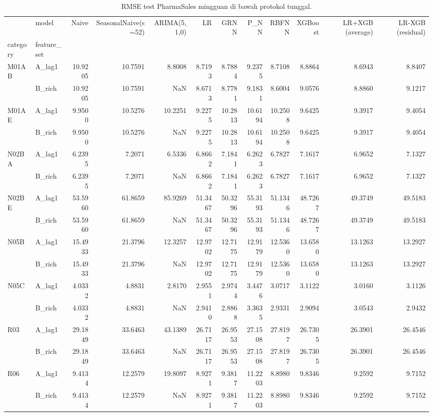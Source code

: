 \begin{table}
\caption{RMSE test PharmaSales mingguan di bawah protokol tunggal.}
\label{tab:tab2_pharma_weekly_rmse}
\begin{tabular}{llrrrrrrrrrr}
\toprule
 & model & Naive & SeasonalNaive(s=52) & ARIMA(5,1,0) & LR & GRNN & P\_NN & RBFNN & XGBoost & LR+XGB (average) & LR-XGB (residual) \\
category & feature_set &  &  &  &  &  &  &  &  &  &  \\
\midrule
\multirow[t]{2}{*}{M01AB} & A\_lag1 & 10.9205 & 10.7591 & 8.8008 & 8.7193 & 8.7884 & 9.2375 & 8.7108 & 8.8864 & 8.6943 & 8.8407 \\
 & B\_rich & 10.9205 & 10.7591 & NaN & 8.6713 & 8.7781 & 9.1831 & 8.6004 & 9.0576 & 8.8860 & 9.1217 \\
\cline{1-12}
\multirow[t]{2}{*}{M01AE} & A\_lag1 & 9.9500 & 10.5276 & 10.2251 & 9.2275 & 10.2813 & 10.6194 & 10.2508 & 9.6425 & 9.3917 & 9.4054 \\
 & B\_rich & 9.9500 & 10.5276 & NaN & 9.2275 & 10.2813 & 10.6194 & 10.2508 & 9.6425 & 9.3917 & 9.4054 \\
\cline{1-12}
\multirow[t]{2}{*}{N02BA} & A\_lag1 & 6.2395 & 7.2071 & 6.5336 & 6.8662 & 7.1841 & 6.2623 & 6.7827 & 7.1617 & 6.9652 & 7.1327 \\
 & B\_rich & 6.2395 & 7.2071 & NaN & 6.8662 & 7.1841 & 6.2623 & 6.7827 & 7.1617 & 6.9652 & 7.1327 \\
\cline{1-12}
\multirow[t]{2}{*}{N02BE} & A\_lag1 & 53.5960 & 61.8659 & 85.9269 & 51.3467 & 50.3296 & 55.3193 & 51.1346 & 48.7267 & 49.3749 & 49.5183 \\
 & B\_rich & 53.5960 & 61.8659 & NaN & 51.3467 & 50.3296 & 55.3193 & 51.1346 & 48.7267 & 49.3749 & 49.5183 \\
\cline{1-12}
\multirow[t]{2}{*}{N05B} & A\_lag1 & 15.4933 & 21.3796 & 12.3257 & 12.9702 & 12.7175 & 12.9179 & 12.5360 & 13.6580 & 13.1263 & 13.2927 \\
 & B\_rich & 15.4933 & 21.3796 & NaN & 12.9702 & 12.7175 & 12.9179 & 12.5360 & 13.6580 & 13.1263 & 13.2927 \\
\cline{1-12}
\multirow[t]{2}{*}{N05C} & A\_lag1 & 4.0332 & 4.8831 & 2.8170 & 2.9551 & 2.9744 & 3.4476 & 3.0717 & 3.1122 & 3.0160 & 3.1126 \\
 & B\_rich & 4.0332 & 4.8831 & NaN & 2.9410 & 2.8868 & 3.3635 & 2.9331 & 2.9094 & 3.0543 & 2.9432 \\
\cline{1-12}
\multirow[t]{2}{*}{R03} & A\_lag1 & 29.1849 & 33.6463 & 43.1389 & 26.7117 & 26.9553 & 27.1508 & 27.8197 & 26.7305 & 26.3901 & 26.4546 \\
 & B\_rich & 29.1849 & 33.6463 & NaN & 26.7117 & 26.9553 & 27.1508 & 27.8197 & 26.7305 & 26.3901 & 26.4546 \\
\cline{1-12}
\multirow[t]{2}{*}{R06} & A\_lag1 & 9.4134 & 12.2579 & 19.8097 & 8.9271 & 9.3817 & 11.2203 & 8.8980 & 9.8346 & 9.2592 & 9.7152 \\
 & B\_rich & 9.4134 & 12.2579 & NaN & 8.9271 & 9.3817 & 11.2203 & 8.8980 & 9.8346 & 9.2592 & 9.7152 \\
\cline{1-12}
\bottomrule
\end{tabular}
\end{table}
